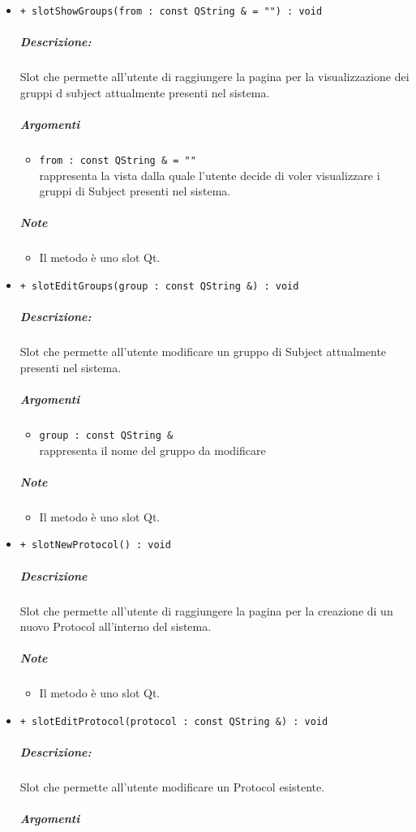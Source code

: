 \begin{itemize}
			\item \color{blue} \verb!+ slotShowGroups(from : const QString & = "") : void!
			\color{black}
			\subparagraph{Descrizione:} Slot\g{} che permette all'utente di raggiungere la pagina per la visualizzazione dei gruppi d subject\g{} attualmente presenti nel sistema.
			\color{black}
			\subparagraph{Argomenti}
			\begin{itemize}
				\item \color{RoyalPurple} \verb!from : const QString & = ""!\\				
\color{black} rappresenta la vista dalla quale l'utente decide di voler visualizzare i gruppi di Subject\g{} presenti nel sistema.
			\end{itemize}
			\subparagraph{Note}
			\begin{itemize}
				\item Il metodo è uno slot\g{} Qt\g{}.
			\end{itemize}
			\item \color{blue} \verb!+ slotEditGroups(group : const QString &) : void!
			\color{black}
			\subparagraph{Descrizione:} Slot\g{} che permette all'utente modificare  un gruppo di Subject\g{} attualmente presenti nel sistema.
			\color{black}
			\subparagraph{Argomenti}
			\begin{itemize}
				\item \color{RoyalPurple} \verb!group : const QString &!\\				
\color{black} rappresenta il nome del gruppo da modificare
			\end{itemize}
			\subparagraph{Note}
			\begin{itemize}
				\item Il metodo è uno slot\g{} Qt\g{}.
			\end{itemize}
			\item \color{blue} \verb!+ slotNewProtocol() : void!
			\color{black}
			\subparagraph{Descrizione} Slot\g{} che permette all'utente di raggiungere la pagina per la creazione di un nuovo Protocol\g{} all'interno del sistema.
			\subparagraph{Note}
			\begin{itemize}
				\item Il metodo è uno slot\g{} Qt\g{}.
			\end{itemize}
			\item \color{blue} \verb!+ slotEditProtocol(protocol : const QString &) : void!
			\color{black}
			\subparagraph{Descrizione:} Slot\g{} che permette all'utente modificare un Protocol\g{} esistente.
			\color{black}
			\subparagraph{Argomenti}

\end{itemize}
